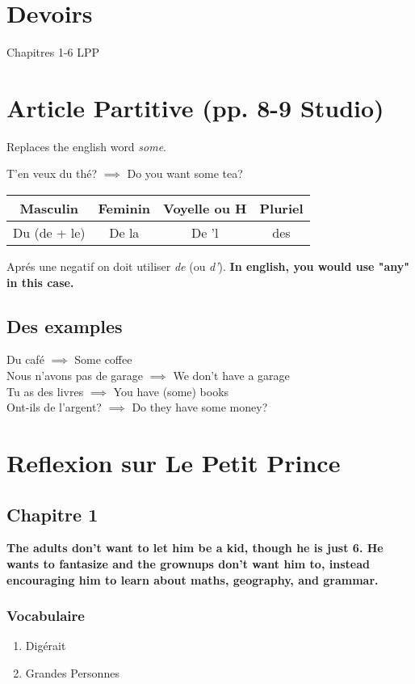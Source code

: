 \documentclass[11pt,twoside]{article}
\begin{document}
	\tableofcontents
	
	\section{Devoirs}
		Chapitres 1-6 LPP
	
	\section{Article Partitive (pp. 8-9 Studio)}
		Replaces the english word \emph{some}.
		
		T'en veux du thé? $\implies$ Do you want some tea?
		
		\begin{tabular}{|c|c|c|c|} \hline
			Masculin & Feminin & Voyelle ou H & Pluriel \\ \hline
			Du (de + le) & De la & De 'l  & des  \\ \hline
		\end{tabular}
		
		Aprés une negatif on doit utiliser \emph{de} (ou \emph{d'}). \textbf{In english, you would use "any" in this case.}
		
		\subsection{Des examples}
			Du café $\implies$ Some coffee \\
			Nous n'avons pas de garage $\implies$ We don't have a garage \\
			Tu as des livres $\implies$ You have (some) books \\
			Ont-ils de l'argent? $\implies$ Do they have some money? \\
			
		\section{Reflexion sur Le Petit Prince}
			\subsection{Chapitre 1}
				\textbf{The adults don't want to let him be a kid, though he is just 6. He wants to fantasize and the grownups don't want him to, instead encouraging him to learn about maths, geography, and grammar.}
				
				\subsubsection{Vocabulaire}
					\begin{enumerate}
						\item{Digérait}
						\item{Grandes Personnes}
					\end{enumerate}
\end{document}
